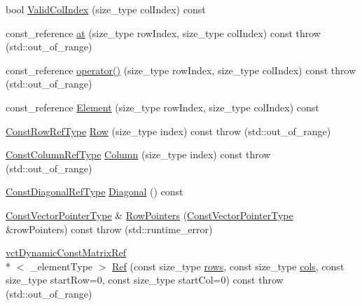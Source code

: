 \begin{DoxyCompactItemize}
bool \hyperlink{classvct_dynamic_const_matrix_base_a054af49cd467727fe8f007d5ed4f0a48}{Valid\-Col\-Index} (size\-\_\-type col\-Index) const 
\item 
const\-\_\-reference \hyperlink{classvct_dynamic_const_matrix_base_a92b4ca4dab487ba7b7f67f1db6e3088f}{at} (size\-\_\-type row\-Index, size\-\_\-type col\-Index) const   throw (std\-::out\-\_\-of\-\_\-range)
\item 
const\-\_\-reference \hyperlink{classvct_dynamic_const_matrix_base_a13173200e9010fad7fa40424a9029071}{operator()} (size\-\_\-type row\-Index, size\-\_\-type col\-Index) const   throw (std\-::out\-\_\-of\-\_\-range)
\item 
const\-\_\-reference \hyperlink{classvct_dynamic_const_matrix_base_a1edb144a06a217e0a800e5de3dd36ab0}{Element} (size\-\_\-type row\-Index, size\-\_\-type col\-Index) const 
\item 
\hyperlink{classvct_dynamic_const_matrix_base_a42a300cb1afd5f0602ba5c2d7d9cc40b}{Const\-Row\-Ref\-Type} \hyperlink{classvct_dynamic_const_matrix_base_a0e6facb1bfd8784e96f0fed8f801f8d0}{Row} (size\-\_\-type index) const   throw (std\-::out\-\_\-of\-\_\-range)
\item 
\hyperlink{classvct_dynamic_const_matrix_base_ac8caf37f979246b1ae99d6e6876879e0}{Const\-Column\-Ref\-Type} \hyperlink{classvct_dynamic_const_matrix_base_a22bac424f1d0acfe10648a2472dfe622}{Column} (size\-\_\-type index) const   throw (std\-::out\-\_\-of\-\_\-range)
\item 
\hyperlink{classvct_dynamic_const_matrix_base_aa497314340719c9e70a4991d3f306d7e}{Const\-Diagonal\-Ref\-Type} \hyperlink{classvct_dynamic_const_matrix_base_ab6946fa750833010b3a72af220c78002}{Diagonal} () const 
\item 
\hyperlink{classvct_dynamic_const_matrix_base_ae4eb1369d9d05fdf98786c5583834e73}{Const\-Vector\-Pointer\-Type} \& \hyperlink{classvct_dynamic_const_matrix_base_a5ff8d15f4a32e893a3ebe8cb13f6c732}{Row\-Pointers} (\hyperlink{classvct_dynamic_const_matrix_base_ae4eb1369d9d05fdf98786c5583834e73}{Const\-Vector\-Pointer\-Type} \&row\-Pointers) const   throw (std\-::runtime\-\_\-error)
\item 
\hyperlink{classvct_dynamic_const_matrix_ref}{vct\-Dynamic\-Const\-Matrix\-Ref}\\*
$<$ \-\_\-element\-Type $>$ \hyperlink{classvct_dynamic_const_matrix_base_ab72f21b72e9a4244833dfb69766dd9bb}{Ref} (const size\-\_\-type \hyperlink{classvct_dynamic_const_matrix_base_a5eac13be2207ebeb8766cde379d73438}{rows}, const size\-\_\-type \hyperlink{classvct_dynamic_const_matrix_base_aa6c51d41a100da49a7e7ac7edb20ecd9}{cols}, const size\-\_\-type start\-Row=0, const size\-\_\-type start\-Col=0) const   throw (std\-::out\-\_\-of\-\_\-range)

\end{DoxyCompactItemize}
